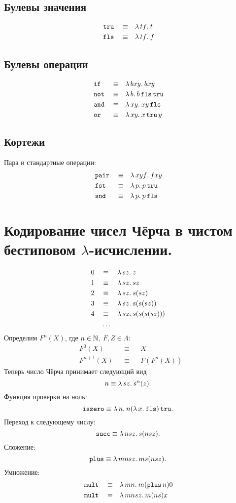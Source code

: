 \documentclass[11pt,a4paper]{article}
\begin{document}
\subsection{Булевы значения}
\[
\begin{aligned}
	&\operatorname{\mathtt{tru}} &&\equiv&& \lambda\,{t f}.\:{t} \\
	&\operatorname{\mathtt{fls}} &&\equiv&& \lambda\,{t f}.\:{f}
\end{aligned}
\]
\subsection{Булевы операции}
\[
\begin{aligned}
	&\operatorname{\mathtt{if}} &&\equiv&& \lambda\,{b x y}.\:{b x y} \\
	&\operatorname{\mathtt{not}} &&\equiv && \lambda\,{b}.\:{b \operatorname{\mathtt{fls}} \operatorname{\mathtt{tru}}} \\
	&\operatorname{\mathtt{and}} &&\equiv && \lambda\,{x y}.\:{x y \operatorname{\mathtt{fls}}} \\
	&\operatorname{\mathtt{or}} &&\equiv && \lambda\,{x y}.\:{x \operatorname{\mathtt{tru}} y}
\end{aligned}
\]
\subsection{Кортежи}
Пара и стандартные операции:
\[
\begin{aligned}
	&\operatorname{\mathtt{pair}} &&\equiv&& \lambda\,{x y f}.\:{f x y} \\
	&\operatorname{\mathtt{fst}} &&\equiv && \lambda\,{p}.\:{p \operatorname{\mathtt{tru}}} \\
	&\operatorname{\mathtt{snd}} &&\equiv && \lambda\,{p}.\:{p \operatorname{\mathtt{fls}}}
\end{aligned}
\]
\section{Кодирование чисел Чёрча в чистом бестиповом $ \lambda $-исчислении.}
\[
\begin{aligned}
	& 0 &&\equiv && \lambda\,{s z}.\:{z} \\
	& 1 && \equiv && \lambda\,{s z}.\:{s z} \\
	& 2 && \equiv && \lambda\,{s z}.\:{s(s z)} \\
	& 3 &&\equiv && \lambda\,{s z}.\:{s(s(s z))} \\
	& 4 &&\equiv && \lambda\,{s z}.\:{s(s(s(s z)))} \\
	&&& \dots && 
\end{aligned}
\]
Определим $ F^{n}(X)$, где $ n \in \mathbb{N}$, $ F, Z \in \Lambda$:
\[
\begin{aligned}
	&F^{0}(X) &&\equiv && X \\
	&F^{n+1}(X) && \equiv && F(F^{n}(X))
\end{aligned}
\]
Теперь число Чёрча принимает следующий вид
\[
	n \equiv \lambda\,{s z}.\:{s^{n}(z)}
.\] 
Функция проверки на ноль:
\[
	\operatorname{\mathtt{iszero}} \equiv \lambda\,{n}.\:{n (\lambda\,{x}.\:{\operatorname{\mathtt{fls}}}) \operatorname{\mathtt{tru}}}
.\] 
Переход к следующему числу:
\[
	\operatorname{\mathtt{succ}} \equiv \lambda\,{n s z}.\:{s (n s z)}
.\] 
Сложение:
\[
	\operatorname{\mathtt{plus}} \equiv \lambda\,{m n s z}.\:{m s (n s z)}
.\] 
Умножение:
\[
\begin{aligned}
	&\operatorname{\mathtt{mult}} &&\equiv&& \lambda\,{m n}.\:{m (\operatorname{\mathtt{plus}} n) 0}\\
	&\operatorname{\mathtt{mult}} &&\equiv&& \lambda\,{m n s z}.\:{m (n s) x}
\end{aligned}
\] 
\end{document}
